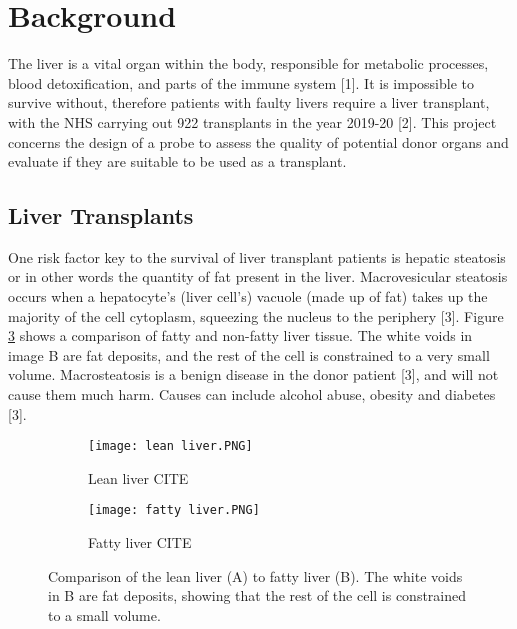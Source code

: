 \section{Background}

The liver is a vital organ within the body, responsible for metabolic processes, blood detoxification, and parts of the immune system [1]. It is impossible to survive without, therefore patients with faulty livers require a liver transplant, with the NHS carrying out 922 transplants in the year 2019-20 [2]. This project concerns the design of a probe to assess the quality of potential donor organs and evaluate if they are suitable to be used as a transplant.


\subsection{Liver Transplants}
One risk factor key to the survival of liver transplant patients is hepatic steatosis or in other words the quantity of fat present in the liver. Macrovesicular steatosis occurs when a hepatocyte’s (liver cell’s) vacuole (made up of fat) takes up the majority of the cell cytoplasm, squeezing the nucleus to the periphery [3]. Figure \ref{fig: livers} shows a comparison of fatty and non-fatty liver tissue. The white voids in image B are fat deposits, and the rest of the cell is constrained to a very small volume. Macrosteatosis is a benign disease in the donor patient [3], and will not cause them much harm. Causes can include alcohol abuse, obesity and diabetes [3].\\

\begin{figure}[h]
	\centering
	\begin{subfigure}[b]{0.4\linewidth}
		\texttt{[image: lean liver.PNG]}
		\caption{Lean liver CITE}
		\label{}
	\end{subfigure}
	\begin{subfigure}[b]{0.4\linewidth}
		\texttt{[image: fatty liver.PNG]}
		\caption{Fatty liver CITE}
		\label{}
	\end{subfigure}
	\caption{Comparison of the lean liver (A) to fatty liver (B). The white voids in B are fat deposits, showing that the rest of the cell is constrained to a small volume.}
	\label{fig: livers}
\end{figure}	


